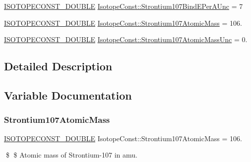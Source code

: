 \begin{DoxyCompactItemize}
\mbox{\hyperlink{group___isotope_const-_macros_ga8f45a7272ce02c0b4c65c44636ed719a}{I\+S\+O\+T\+O\+P\+E\+C\+O\+N\+S\+T\+\_\+\+D\+O\+U\+B\+LE}} \mbox{\hyperlink{group___isotope_const-_strontium-_sr107_gaecffd608d946d8af9d798181dbd8bc31}{Isotope\+Const\+::\+Strontium107\+Bind\+E\+Per\+A\+Unc}} = 7
\item 
\mbox{\hyperlink{group___isotope_const-_macros_ga8f45a7272ce02c0b4c65c44636ed719a}{I\+S\+O\+T\+O\+P\+E\+C\+O\+N\+S\+T\+\_\+\+D\+O\+U\+B\+LE}} \mbox{\hyperlink{group___isotope_const-_strontium-_sr107_gad2851b4b93ba45021a0bf20c267602a7}{Isotope\+Const\+::\+Strontium107\+Atomic\+Mass}} = 106.
\item 
\mbox{\hyperlink{group___isotope_const-_macros_ga8f45a7272ce02c0b4c65c44636ed719a}{I\+S\+O\+T\+O\+P\+E\+C\+O\+N\+S\+T\+\_\+\+D\+O\+U\+B\+LE}} \mbox{\hyperlink{group___isotope_const-_strontium-_sr107_ga0a454251774013c6b5b14d1985a63ea6}{Isotope\+Const\+::\+Strontium107\+Atomic\+Mass\+Unc}} = 0.
\end{DoxyCompactItemize}


\subsection{Detailed Description}


\subsection{Variable Documentation}
\mbox{\label{group___isotope_const-_strontium-_sr107_gad2851b4b93ba45021a0bf20c267602a7}} 
\subsubsection{\texorpdfstring{Strontium107\+Atomic\+Mass}{Strontium107AtomicMass}}
{\footnotesize\ttfamily \mbox{\hyperlink{group___isotope_const-_macros_ga8f45a7272ce02c0b4c65c44636ed719a}{I\+S\+O\+T\+O\+P\+E\+C\+O\+N\+S\+T\+\_\+\+D\+O\+U\+B\+LE}} Isotope\+Const\+::\+Strontium107\+Atomic\+Mass = 106.}

\$ \$ Atomic mass of Strontium-\/107 in amu. \mbox{\label{group___isotope_const-_strontium-_sr107_ga0a454251774013c6b5b14d1985a63ea6}} 
